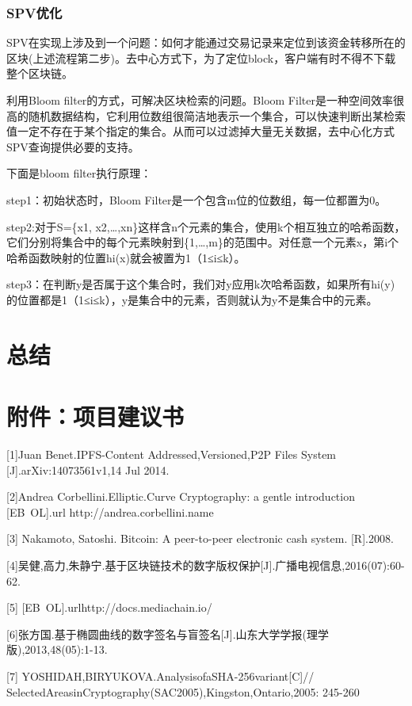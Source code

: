 \documentclass[withoutpreface,bwprint]{cumcmthesis} %
\begin{document}
\subsubsection{SPV优化}

SPV在实现上涉及到一个问题：如何才能通过交易记录来定位到该资金转移所在的区块(上述流程第二步)。去中心方式下，为了定位block，客户端有时不得不下载整个区块链。

利用Bloom filter的方式，可解决区块检索的问题。Bloom Filter是一种空间效率很高的随机数据结构，它利用位数组很简洁地表示一个集合，可以快速判断出某检索值一定不存在于某个指定的集合。从而可以过滤掉大量无关数据，去中心化方式SPV查询提供必要的支持。

下面是bloom filter执行原理：

step1：初始状态时，Bloom Filter是一个包含m位的位数组，每一位都置为0。

step2:对于S=\{x1, x2,…,xn\}这样含n个元素的集合，使用k个相互独立的哈希函数，它们分别将集合中的每个元素映射到\{1,…,m\}的范围中。对任意一个元素x，第i个哈希函数映射的位置hi(x)就会被置为1（1≤i≤k）。   

step3：在判断y是否属于这个集合时，我们对y应用k次哈希函数，如果所有hi(y)的位置都是1（1≤i≤k），y是集合中的元素，否则就认为y不是集合中的元素。

\section{总结}

\section{附件：项目建议书}

[1]Juan Benet.IPFS-Content Addressed,Versioned,P2P Files System [J].arXiv:14073561v1,14 Jul 2014.

[2]Andrea Corbellini.Elliptic.Curve Cryptography: a gentle introduction [EB\ OL].url{ http://andrea.corbellini.name}

[3] Nakamoto, Satoshi. Bitcoin: A peer-to-peer electronic cash system. [R].2008.

[4]吴健,高力,朱静宁.基于区块链技术的数字版权保护[J].广播电视信息,2016(07):60-62.

[5] [EB\ OL].url{http://docs.mediachain.io/}

[6]张方国.基于椭圆曲线的数字签名与盲签名[J].山东大学学报(理学版),2013,48(05):1-13.

[7] YOSHIDAH,BIRYUKOVA.AnalysisofaSHA-256variant[C]//
SelectedAreasinCryptography(SAC2005),Kingston,Ontario,2005:
245-260
\end{document}

